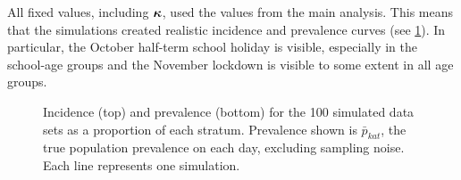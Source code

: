 \documentclass[thesis.tex]{subfiles}
\begin{document}
All fixed values, including $\bm{\kappa}$, used the values from the main analysis.
This means that the simulations created realistic incidence and prevalence curves (see \cref{SEIR:fig:sim-data}).
In particular, the October half-term school holiday is visible, especially in the school-age groups and the November lockdown is visible to some extent in all age groups.
\begin{figure}
    \vspace{-3cm}
    \caption[Simulated data]{%
        Incidence (top) and prevalence (bottom) for the 100 simulated data sets as a proportion of each stratum.
        Prevalence shown is $\bar{p}_{kat}$, the true population prevalence on each day, excluding sampling noise.
        Each line represents one simulation.
    }
    \label{SEIR:fig:sim-data}
\end{figure}
\end{document}
